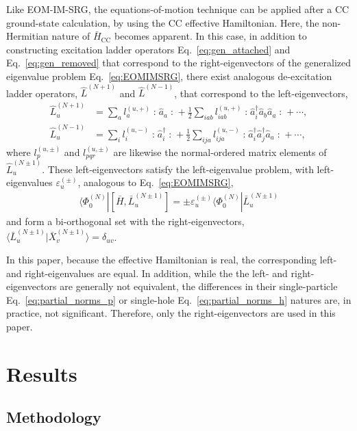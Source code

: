 \documentclass[aip, jcp, 12pt]{revtex4-1}
\newcommand{\bra}[1]{\langle #1 |}
\newcommand{\braket}[2]{\langle #1 | #2\rangle}
\newcommand{\normord}[1]{\mathopen: #1 \mathclose:}
\begin{document}
Like EOM-IM-SRG, the equations-of-motion technique can be applied after a CC ground-state calculation, by using the CC effective Hamiltonian.  Here, the non-Hermitian nature of $\bar{H}_{\mathrm{CC}}$ becomes apparent.  In this case, in addition to constructing excitation ladder operators Eq.\ \eqref{eq:gen_attached} and Eq.\ \eqref{eq:gen_removed} that correspond to the right-eigenvectors of the generalized eigenvalue problem Eq.\ \eqref{eq:EOMIMSRG}, there exist analogous de-excitation ladder operators, $\hat{L}^{(N + 1)}$ and $\hat{L}^{(N - 1)}$, that correspond to the left-eigenvectors,
\begin{align*}
    \hat{L}^{(N + 1)}_u &= \sum_a l^{(u, +)}_a \normord{\hat{a}_a^{}} + \frac{1}{2} \sum_{i a b} l^{(u, +)}_{i a b} \normord{\hat{a}^\dagger_i \hat{a}_b^{} \hat{a}_a^{}} + \cdots, \\
    \hat{L}^{(N - 1)}_u &= \sum_i l_i^{(u, -)} \normord{\hat{a}^\dagger_i} + \frac{1}{2} \sum_{i j a} l^{(u, -)}_{i j a} \normord{\hat{a}^\dagger_i \hat{a}^\dagger_j \hat{a}_a^{}} + \cdots,
\end{align*}
where $l^{(u, \pm)}_p$ and $l^{(u, \pm)}_{p q r}$ are likewise the normal-ordered matrix elements of $\hat{L}^{(N \pm 1)}_u$.  These left-eigenvectors satisfy the left-eigenvalue problem, with left-eigenvalues $\varepsilon^{(\pm)}_u$, analogous to Eq.\ \eqref{eq:EOMIMSRG},
\begin{align*}
  \bra{\Phi^{(N)}_0} [\bar{H}, \bar{L}^{(N \pm 1)}_u] = \pm \varepsilon^{(\pm)}_u \bra{\Phi^{(N)}_0} \bar{L}^{(N \pm 1)}_u
\end{align*}
and form a bi-orthogonal set with the right-eigenvectors, $\braket{\bar{L}^{(N \pm 1)}_u}{\bar{X}^{(N \pm 1)}_v} = \delta_{u v}$.

In this paper, because the effective Hamiltonian is real, the corresponding left- and right-eigenvalues are equal. In addition, while the the left- and right-eigenvectors are generally not equivalent, the differences in their single-particle Eq.\ \eqref{eq:partial_norms_p} or single-hole Eq.\ \eqref{eq:partial_norms_h} natures are, in practice, not significant.  Therefore, only the right-eigenvectors are used in this paper.

\section{Results}
\label{sec:results}

\subsection{Methodology}
\label{subsec:methodology}
\end{document}
